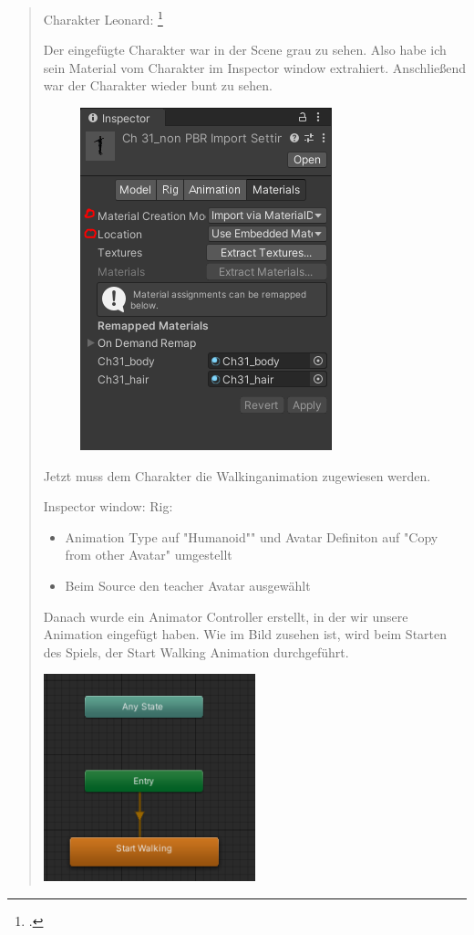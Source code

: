\begin{quote}
	Charakter Leonard: \footcite{LehrerCharakter}
	
	Der eingefügte Charakter war in der Scene grau zu sehen. Also habe ich
	sein Material vom Charakter im Inspector window extrahiert. Anschließend
	war der Charakter wieder bunt zu sehen.

	
\begin{figure}
	\centering
	\includegraphics[width=0.5\linewidth]{img/SemihSoenmez_IMG/Inspector_SS_KW44_251021}
	\caption{}
	\label{fig:inspectorsskw44251021}
\end{figure}

	
	Jetzt muss dem Charakter die Walkinganimation zugewiesen werden.
	
	Inspector window: Rig:
	
	\begin{itemize}
		\item
		Animation Type auf "Humanoid"" und Avatar Definiton auf "Copy from
		other Avatar" umgestellt
		\item
		Beim Source den teacher Avatar ausgewählt
	\end{itemize}
	
	Danach wurde ein Animator Controller erstellt, in der wir unsere
	Animation eingefügt haben. Wie im Bild zusehen ist, wird beim Starten
	des Spiels, der Start Walking Animation durchgeführt.
	\begin{center}
		\includegraphics[frame, height=6cm]{img/SemihSoenmez_IMG/StateMachine_SS_KW44_251021.png}
	\end{center}
\end{quote}

